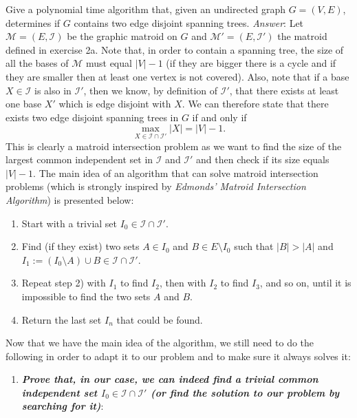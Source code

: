 \documentclass[10pt]{article}
\newenvironment{exercise}[2][Exercise]{\begin{trivlist}
  \item[\hskip \labelsep {\bfseries #1}\hskip \labelsep {\bfseries #2.}]}{\end{trivlist}}
\begin{document}
   \begin{exercise}{2b}
  Give a polynomial time algorithm that, given an undirected graph $G = (V,E)$, determines if $G$ contains two edge disjoint spanning trees. \newline
  \emph{Answer}: Let $\mathcal{M}=(E,\mathcal{I})$ be the graphic matroid on $G$ and $\mathcal{M}'=(E,\mathcal{I}')$ the matroid defined in exercise 2a. Note that, in order to contain a spanning tree, the size of all the bases of $\mathcal{M}$ must equal $|V|-1$ (if they are bigger there is a cycle and if they are smaller then at least one vertex is not covered). Also, note that if a base $X \in \mathcal{I}$ is also in $\mathcal{I}'$, then we know, by definition of $\mathcal{I}'$, that there exists at least one base $X'$ which is edge disjoint with $X$. We can therefore state that there exists two edge disjoint spanning trees in $G$ if and only if \
 \begin{displaymath}
  \max_{X \in \mathcal{I} \cap \mathcal{I}'} |X| = |V|-1.
  \end{displaymath}
  This is clearly a matroid intersection problem as we want to find the size of the largest common independent set in $\mathcal{I}$ and $\mathcal{I}'$ and then check if its size equals $|V|-1$. The main idea of an algorithm that can solve matroid intersection problems (which is strongly inspired by \emph{Edmonds' Matroid Intersection Algorithm}) is presented below:
  \begin{enumerate}
  \item Start with a trivial set $I_0\in \mathcal{I} \cap \mathcal{I}'$.
  \item Find (if they exist) two  sets $A \in I_0$ and $B \in E \setminus I_0$ such that $|B| > |A|$ and $I_1 := (I_0\setminus A) \cup B \in \mathcal{I} \cap \mathcal{I}'$. 
  \item Repeat step 2) with $I_1$ to find $I_2$, then with $I_2$ to find $I_3$, and so on, until it is impossible to find the two sets $A$ and $B$. 
  \item Return the last set $I_n$ that could be found. 
  \end{enumerate} 
Now that we have the main idea of the algorithm, we still need to do the following in order to adapt it to our problem and to make sure it always solves it:
\begin{enumerate}
\item \textbf{\emph{Prove that, in our case, we can indeed find a trivial common independent set $I_0 \in \mathcal{I} \cap \mathcal{I}'$ (or find the solution to our problem by searching for it)}}: 

\end{enumerate}
\end{exercise}
\end{document}
